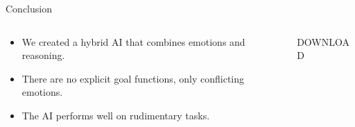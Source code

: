 \documentclass[final,hyperref={pdfpagelabels=false}]{beamer}
\begin{document}
\begin{frame}
\begin{columns}[t]
\begin{column}{.45\textwidth}
            \begin{block}{Conclusion}
                \begin{columns}[t]
                    \begin{column}{0.77\textwidth}
                        \begin{itemize}
                            \item We created a hybrid AI that combines emotions and reasoning.
                            \item There are no explicit goal functions, only conflicting emotions.
                            \item The AI performs well on rudimentary tasks.
                        \end{itemize}
                    \end{column}
                    \begin{column}{0.23\textwidth}
                        \begin{block}{DOWNLOAD}
                            \begin{center}
                        \end{center}
                        \end{block}
                    \end{column}
                \end{columns}
            \end{block}
        \end{column}
    \end{columns}
\end{frame}
\end{document}
